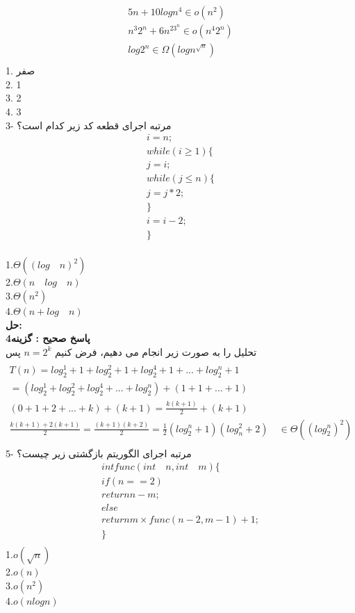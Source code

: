 \documentclass{book}
\begin{document}
\begin{align*}
5n + 10 log n^4 \in o(n^2) \\
n^3 2^n + 6 n^23^n \in o(n^4 2^n) \\ 
log 2^n \in \Omega(logn^{\sqrt{n}}) \\
\end{align*}
1. صفر \\ 2. 1 \\ 3. 2 \\ 4. 3 \\
 3- مرتبه اجرای قطعه کد زیر کدام است؟
\begin{align*}
i=n; \\
while(i\geq 1)\lbrace\\
j=i; \\
while(j\leq n)\lbrace \\
j=j*2; \\
\rbrace \\
i=i-2; \\
\rbrace \\
\end{align*}

1.$\Theta ((log \quad n)^2)$\\
2.$\Theta(n \quad log \quad n)$\\
3.$\Theta (n^2)$\\
4.$\Theta(n+log \quad n)$\\
\textbf{حل:}\\
\textbf{پاسخ صحیح : گزینه4}\\
تحلیل را به صورت زیر انجام می دهیم، فرض کنیم $n=2^k$ پس
\begin{align*}\\
T(n)=log^1_2 +1 + log^2_2 +1+log^4_2 +1+... + log^n_2 +1 \\
=(log^1_2  + log^2_2 +log^4_2 +... + log^n_2)+(1+1+...+1)\\
(0+1+2+...+k)+(k+1)=\frac{k(k+1)}{2}+(k+1) \\
\frac{k(k+1)+2(k+1)}{2}=\frac{(k+1)(k+2)}{2}=\frac{1}{2}(log^n_2+1)(log^2_n+2) \quad \in \Theta ((log^n_2)^2)\\
\end{align*}
5- مرتبه اجرای الگوریتم بازگشتی زیر چیست؟\\
\begin{align*}
int func(int \quad n , int \quad m)\lbrace \\
if (n==2) \\
return n-m; \\
else \\
return m\times func(n-2,m-1)+1 ;\\
\rbrace \\
\end{align*}
1.$o(\sqrt{n})$\\
2.$o(n)$\\
3.$o(n^2)$ \\
4.$o(nlogn)$ \\
\end{document}
